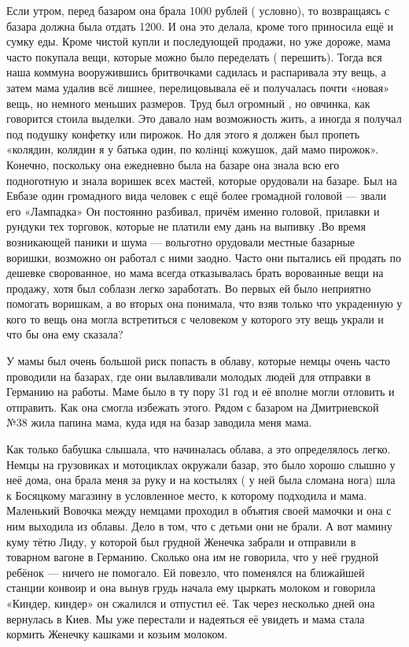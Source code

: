 Если утром, перед базаром она брала 1000 рублей ( условно), то
возвращаясь с базара должна была отдать 1200. И она это делала, кроме того
приносила ещё и сумку еды. Кроме чистой купли и последующей продажи, но уже
дороже, мама часто покупала вещи, которые можно было переделать ( перешить).
Тогда вся наша коммуна вооружившись бритвочками  садилась и распаривала эту
вещь, а затем мама удалив  всё лишнее, перелицовывала её и получалась почти
«новая» вещь, но немного меньших размеров. Труд был огромный , но овчинка, как
говорится стоила выделки. Это давало нам возможность жить, а иногда я получал
под подушку конфетку или пирожок. Но для этого я должен был пропеть «колядин,
колядин я  у батька один, по колiнцi кожушок, дай мамо пирожок». Конечно,
поскольку она ежедневно была на базаре она знала всю его подноготную и знала
воришек всех мастей, которые орудовали на базаре. Был на Евбазе один громадного
вида человек  с  ещё более громадной головой — звали его  «Лампадка» Он
постоянно разбивал, причём именно головой, прилавки и рундуки тех торговок,
которые не платили ему дань на выпивку .Во время возникающей паники и шума —
вольготно  орудовали местные базарные воришки, возможно он работал с ними
заодно. Часто они пытались ей продать по дешевке сворованное, но мама всегда
отказывалась брать ворованные вещи на продажу, хотя был соблазн легко
заработать. Во первых ей было неприятно помогать воришкам, а во вторых она
понимала, что взяв только что украденную у кого то вещь  она  могла
встретиться  с человеком у которого эту вещь украли и что бы она ему сказала?

У мамы был очень большой риск попасть в облаву, которые немцы очень часто
проводили на базарах, где они вылавливали молодых людей для отправки в Германию
на работы. Маме было в ту пору 31 год и её вполне могли отловить и отправить.
Как она смогла избежать этого. Рядом с базаром на Дмитриевской №38 жила папина
мама, куда идя на базар заводила меня мама. 

Как только бабушка слышала, что
начиналась облава, а это определялось легко. Немцы на грузовиках и мотоциклах
окружали базар, это было хорошо слышно у неё дома, она брала меня за руку и на
костылях ( у ней была сломана нога) шла к Босяцкому магазину в условленное
место, к которому подходила и мама. Маленький Вовочка между немцами проходил в
объятия своей мамочки и она с ним выходила из облавы. Дело в том, что с детьми
они не брали. А вот мамину куму  тётю Лиду, у которой был грудной Женечка
забрали и отправили  в товарном вагоне в Германию. Сколько она им не говорила,
что у неё грудной ребёнок — ничего не помогало.  Ей повезло, что поменялся  на
ближайшей станции конвоир и она вынув грудь  начала ему цыркать  молоком и
говорила «Киндер, киндер» он  сжалился и отпустил её. Так через несколько дней
она вернулась в Киев.   Мы уже перестали и надеяться её увидеть и мама стала
кормить Женечку кашками и козьим молоком.

